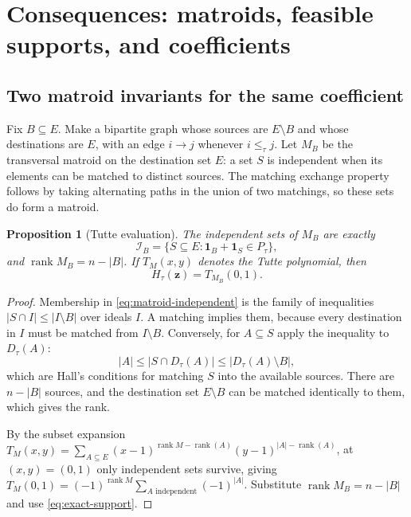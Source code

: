 \documentclass[11pt]{article}
\numberwithin{equation}{section}
\newtheorem{proposition}[theorem]{Proposition}
\theoremstyle{definition}
\theoremstyle{remark}
\newcommand{\one}{\mathbf 1}
\newcommand{\rank}{\operatorname{rank}}
\newcommand{\Ical}{\mathcal I}
\newcommand{\zt}[1]{\mathbf z^{#1}}
\begin{document}
\section{Consequences: matroids, feasible supports, and coefficients}
\label{sec:consequences}

\subsection{Two matroid invariants for the same coefficient}

Fix $B\subseteq E$. Make a bipartite graph whose sources are $E\setminus B$
and whose destinations are $E$, with an edge $i\to j$ whenever $i\le_\tau j$.
Let $M_B$ be the transversal matroid on the destination set $E$: a set $S$ is
independent when its elements can be matched to distinct sources. The matching
exchange property follows by taking alternating paths in the union of two
matchings, so these sets do form a matroid.

\begin{proposition}[Tutte evaluation]
\label{prop:matroid}
The independent sets of $M_B$ are exactly
\begin{equation}
 \Ical_B=\{S\subseteq E:\one_B+\one_S\in P_\tau\},
 \label{eq:matroid-independent}
\end{equation}
and $\rank M_B=n-|B|$. If $T_M(x,y)$ denotes the Tutte polynomial, then
\begin{equation}
 [\zt B]H_\tau(\mathbf z)=T_{M_B}(0,1).
 \label{eq:tutte}
\end{equation}
\end{proposition}

\begin{proof}
Membership in \eqref{eq:matroid-independent} is the family of inequalities
$|S\cap I|\le|I\setminus B|$ over ideals $I$. A matching implies them, because
every destination in $I$ must be matched from $I\setminus B$. Conversely, for
$A\subseteq S$ apply the inequality to $D_\tau(A)$:
\[
 |A|\le|S\cap D_\tau(A)|\le|D_\tau(A)\setminus B| ,
\]
which are Hall's conditions for matching $S$ into the available sources. There
are $n-|B|$ sources, and the destination set $E\setminus B$ can be matched
identically to them, which gives the rank.

By the subset expansion
$T_M(x,y)=\sum_{A\subseteq E}(x-1)^{\rank M-\rank(A)}(y-1)^{|A|-\rank(A)}$, at
$(x,y)=(0,1)$ only independent sets survive, giving
$T_M(0,1)=(-1)^{\rank M}\sum_{A\text{ independent}}(-1)^{|A|}$. Substitute
$\rank M_B=n-|B|$ and use \eqref{eq:exact-support}.
\end{proof}
\end{document}
